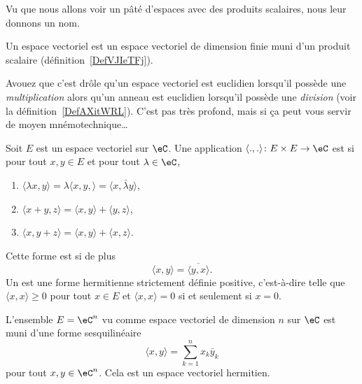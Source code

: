 Vu que nous allons voir un pâté d'espaces avec des produits scalaires, nous leur donnons un nom.
\begin{definition}\label{DefLZMcvfj}
    Un espace vectoriel  est un espace vectoriel de dimension finie muni d'un produit scalaire (définition~\ref{DefVJIeTFj}).
\end{definition}
Avouez que c'est drôle qu'un espace vectoriel est euclidien lorsqu'il possède une \emph{multiplication} alors qu'un anneau est euclidien lorsqu'il possède une \emph{division} (voir la définition~\ref{DefAXitWRL}). C'est pas très profond, mais si ça peut vous servir de moyen mnémotechnique\ldots

\begin{definition}  \label{DefMZQxmQ}
    Soit \( E\) est un espace vectoriel sur \( \eC\). Une application \( \langle ., .\rangle \colon E\times E\to \eC\) est  si pour tout \( x,y\in E\) et pour tout \( \lambda\in \eC\),
    \begin{enumerate}
        \item
            \( \langle \lambda x, y\rangle =\lambda\langle x,y, \rangle =\langle x, \bar\lambda y\rangle \),
        \item
            \( \langle x+y, z\rangle =\langle x, y\rangle+\langle y, z\rangle  \),
        \item
            \( \langle x, y+z\rangle =\langle x, y\rangle +\langle x, z\rangle \).
    \end{enumerate}
    Cette forme est  si de plus
    \begin{equation}
        \langle x, y\rangle =\overline{ \langle y, x\rangle  }.
    \end{equation}
    Un  est une forme hermitienne strictement définie positive, c'est-à-dire telle que \( \langle x, x\rangle \geq 0\) pour tout \( x\in E\) et \( \langle x, x\rangle =0\) si et seulement si \( x=0\).
\end{definition}

\begin{example}
    L'ensemble \( E=\eC^n\) vu comme espace vectoriel de dimension \( n\) sur \( \eC\)  est muni d'une forme sesquilinéaire
    \begin{equation}    \label{EqFormSesqQrjyPH}
        \langle x, y\rangle =\sum_{k=1}^nx_k\bar y_k
    \end{equation}
    pour tout \( x,y\in\eC^n\). Cela est un espace vectoriel hermitien.
\end{example}

